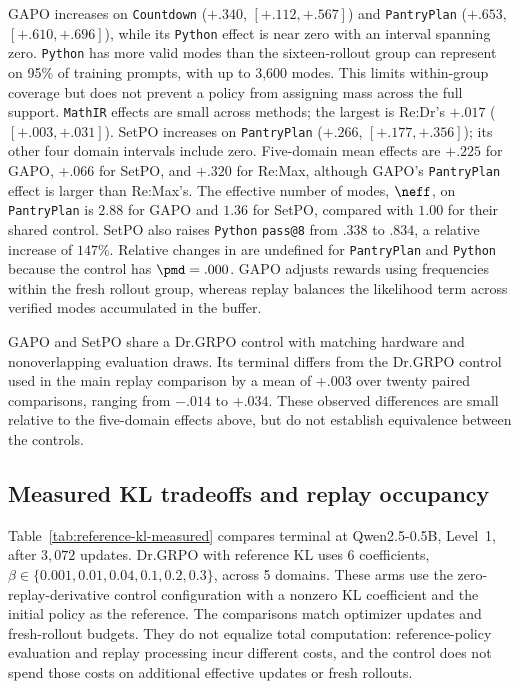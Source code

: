 GAPO increases \pmd{} on \texttt{Countdown} ($+.340$, $[+.112,+.567]$) and \texttt{PantryPlan}
($+.653$, $[+.610,+.696]$), while its \texttt{Python} effect is near zero
with an interval spanning zero. \texttt{Python} has more valid modes than the
sixteen-rollout group can represent on 95\% of training prompts, with up to 3,600
modes. This limits within-group coverage but does not prevent a policy from
assigning mass across the full support. \texttt{MathIR} effects are small across
methods; the largest is Re:Dr's $+.017$ ($[+.003,+.031]$).
SetPO increases \pmd{} on \texttt{PantryPlan} ($+.266$, $[+.177,+.356]$); its other
four domain intervals include zero. Five-domain mean effects are $+.225$
for GAPO, $+.066$ for SetPO, and $+.320$ for Re:Max, although GAPO's
\texttt{PantryPlan} effect is larger than Re:Max's. The effective number
of modes, $\neff$, on \texttt{PantryPlan} is $2.88$ for GAPO and $1.36$
for SetPO, compared with $1.00$ for their shared control. SetPO also raises
\texttt{Python} \texttt{pass@8} from $.338$ to $.834$, a relative increase
of $147\%$. Relative changes in \pmd{} are undefined for \texttt{PantryPlan}
and \texttt{Python} because the control has $\pmd=.000$. GAPO adjusts
rewards using frequencies within the fresh rollout group, whereas replay
balances the likelihood term across verified modes accumulated in the buffer.

GAPO and SetPO share a Dr.GRPO control with matching hardware and
nonoverlapping evaluation draws. Its terminal \pmd{} differs from the
Dr.GRPO control used in the main replay comparison by a mean of $+.003$
over twenty paired comparisons, ranging from $-.014$ to $+.034$. These
observed differences are small relative to the five-domain effects above,
but do not establish equivalence between the controls.

\subsection{Measured KL tradeoffs and replay occupancy}
\label{app:kl-measured}

Table~\ref{tab:reference-kl-measured} compares terminal \pmd{} at
Qwen2.5-0.5B, Level~1, after $3{,}072$ updates. Dr.GRPO with reference KL
uses 6 coefficients, $\beta\in\{0.001, 0.01, 0.04, 0.1, 0.2, 0.3\}$, across
5 domains. These arms use the zero-replay-derivative control
configuration with a nonzero KL coefficient and the initial policy as the
reference. The comparisons match optimizer updates and fresh-rollout
budgets. They do not equalize total computation: reference-policy evaluation
and replay processing incur different costs, and the control does not spend
those costs on additional effective updates or fresh rollouts.


